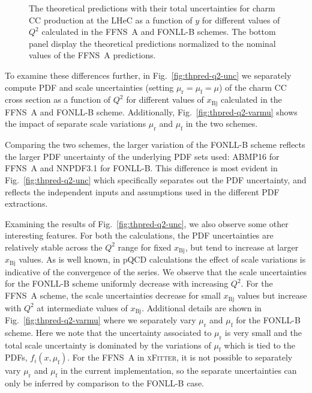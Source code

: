 \documentclass[pdftex,twocolumn,epjc3]{svjour3}          %
\newcommand{\xfitter} {\textsc{xFitter}\xspace}
\newcommand{\xbj}{\ensuremath{x_{\text{Bj}}}\xspace}
\newcommand{\fonll} {{FONLL-B}\xspace}
\newcommand{\ffns} {{FFNS~A}\xspace}
\begin{document}
\begin{figure}
    \centering
    \caption{The theoretical predictions with their total
      uncertainties for charm CC production at the LHeC as a function
      of $y$ for different values of $Q^2$ calculated in the \ffns and
      \fonll schemes. The bottom panel display the theoretical
      predictions normalized to the nominal values of the \ffns
      predictions.}
    \label{fig:thpred-y}
\end{figure}

To examine these differences further, in Fig.~\ref{fig:thpred-q2-unc}
we separately compute PDF and scale uncertainties (setting
$\mu_\mathrm{r}=\mu_\mathrm{f}=\mu$) of the charm CC cross section as
a function of $Q^2$ for different values of \xbj calculated in the
\ffns and \fonll scheme.
%
Additionally, Fig.~\ref{fig:thpred-q2-varmu} shows the impact of
separate scale variations $\mu_\mathrm{r}$ and $\mu_\mathrm{f}$ in the
two schemes.

Comparing the two schemes, the larger variation of the \fonll scheme
reflects the larger PDF uncertainty of the underlying PDF sets used:
ABMP16 for \ffns and NNPDF3.1 for \fonll.
%
This difference is most evident in Fig.~\ref{fig:thpred-q2-unc} which
specifically separates out the PDF uncertainty, and reflects the
independent inputs and assumptions used in the different PDF
extractions.

Examining the results of Fig.~\ref{fig:thpred-q2-unc}, we also observe
some other interesting features.
%
For both the calculations, the PDF uncertainties are relatively stable
across the  $Q^2$ range for fixed \xbj, but tend to increase at larger \xbj values.
%
As is well known, in pQCD calculations the effect of scale variations
is indicative of the convergence of the series.
%
We observe that the scale uncertainties for the \fonll scheme
uniformly decrease with increasing $Q^2$.
%
For the \ffns scheme, the scale uncertainties decrease for small \xbj
values but increase with $Q^2$ at intermediate values of \xbj.
%
Additional details are shown in Fig.~\ref{fig:thpred-q2-varmu} where
we separately vary $\mu_\mathrm{r}$ and $\mu_\mathrm{f}$ for the
\fonll scheme. Here we note that the uncertainty associated to
$\mu_\mathrm{r}$ is very small and the total scale uncertainty is
dominated by the variations of $\mu_\mathrm{f}$ which is tied to the
PDFs, $f_i(x,\mu_\mathrm{f})$.
%
For the \ffns in \xfitter, it is not possible to separately vary
$\mu_\mathrm{r}$ and $\mu_\mathrm{f}$ in the current implementation,
so the separate uncertainties can only be inferred by comparison to
the \fonll case.
\end{document}
